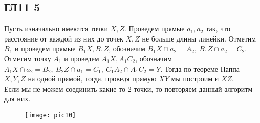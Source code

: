 \subsection*{ГЛ11 5}
Пусть изначально имеются точки $X,Z$. Проведем прямые $a_1,a_2$ так, что расстояние от каждой из них до точек $X,Z$ не больше длины линейки. Отметим $B_1$ и проведем прямые $B_1X, B_1Z$, обозначим $B_1X \cap a_2 = A_2,\ B_1Z \cap a_2 = C_2$. Отметим точку $A_1$ и проведем $A_1X, A_1C_2$, обозначим $A_1X \cap a_2 = B_2,\ B_2Z \cap a_1 = C_1,\ C_1A_2 \cap A_1C_2 = Y$. Тогда по теореме Паппа $X,Y,Z$ на одной прямой, тогда, проведя прямую $XY$ мы построим и $XZ$.\\
Если мы не можем соединить какие-то 2 точки, то повторяем данный алгоритм для них.   
\begin{figure}[h]
	\texttt{[image: pic10]}
\end{figure}
